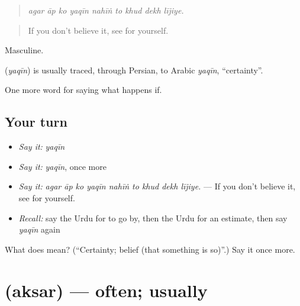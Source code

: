 \begin{quote}
        
\end{quote}

\begin{quote}
\emph{agar āp ko yaqīn nahīṅ to khud dekh lījiye.}
\end{quote}

\begin{quote}
If you don't believe it, see for yourself.
\end{quote}

Masculine.

\begin{cousinweb}
\textbf{} (\emph{yaqīn}) is usually traced, through Persian, to Arabic \emph{yaqīn}, \textquotedblleft{}certainty\textquotedblright{}.
\end{cousinweb}

\begin{grammarlens}[title={What you've built}]
One more word for saying what happens if.
\end{grammarlens}

\subsection*{Your turn}
\begin{itemize}
\raggedright
  \item \emph{Say it:} \emph{yaqīn}
  \item \emph{Say it:} \emph{yaqīn}, once more
  \item \emph{Say it:} \emph{agar āp ko yaqīn nahīṅ to khud dekh lījiye.} — If you don't believe it, see for yourself.
  \item \emph{Recall:} say the Urdu for to go by, then the Urdu for an estimate, then say \emph{yaqīn} again
\end{itemize}

\begin{tcolorbox}[breakable,colback=teal!4,colframe=teal!35!black,title={Before you move on}]
What does  mean? (\textquotedblleft{}Certainty; belief (that something is so)\textquotedblright{}.) Say it once more.
\end{tcolorbox}
\section[\texorpdfstring{\ur{اکثر} (aksar)}{اکثر (aksar)}]{ (aksar) — often; usually}


